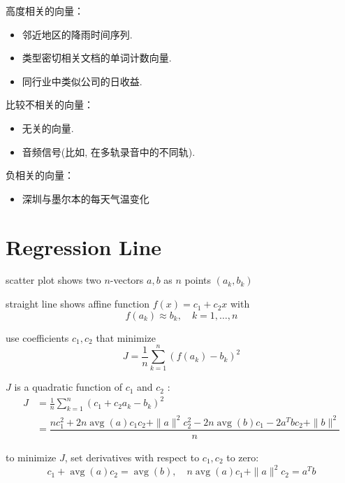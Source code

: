 \begin{example}
    高度相关的向量：
\begin{itemize}
    \item 邻近地区的降雨时间序列. 
    \item 类型密切相关文档的单词计数向量. 
    \item 同行业中类似公司的日收益. 
\end{itemize}

比较不相关的向量：
\begin{itemize}
    \item 无关的向量. 
    \item 音频信号(比如, 在多轨录音中的不同轨). 
\end{itemize}

负相关的向量：
\begin{itemize}
    \item 深圳与墨尔本的每天气温变化
\end{itemize}
\end{example}

\section{Regression Line}

scatter plot shows two $ n $-vectors $ a, b $ as $ n $ points $ \left(a_{k}, b_{k}\right) $

straight line shows affine function $ f(x)=c_{1}+c_{2} x $ with
$$
f\left(a_{k}\right) \approx b_{k}, \quad k=1, \ldots, n
$$

\begin{problem}
    use coefficients $ c_{1}, c_{2} $ that minimize $$ J=\frac{1}{n} \sum_{k=1}^{n}\left(f\left(a_{k}\right)-b_{k}\right)^{2} $$

    $ J $ is a quadratic function of $ c_{1} $ and $ c_{2} $ :
$$
\begin{aligned}
J &=\frac{1}{n} \sum_{k=1}^{n}\left(c_{1}+c_{2} a_{k}-b_{k}\right)^{2} \\
&=  \dfrac{n c_{1}^{2}+2 n \operatorname{a v g}(a) c_{1} c_{2}+\|a\|^{2} c_{2}^{2}-2 n \operatorname{avg}(b) c_{1}-2 a^{T} b c_{2}+\|b\|^{2}}{ n}
\end{aligned}
$$
\end{problem}

to minimize $ J $, set derivatives with respect to $ c_{1}, c_{2} $ to zero:
$$
c_{1}+\operatorname{avg}(a) c_{2}=\operatorname{avg}(b), \quad n \operatorname{avg}(a) c_{1}+\|a\|^{2} c_{2}=a^{T} b
$$


